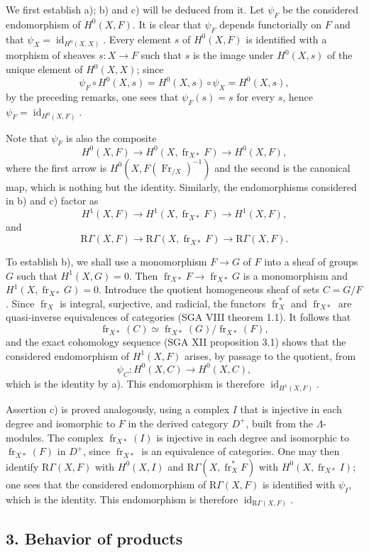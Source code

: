 \documentclass[11pt]{article}
\providecommand{\RGamma}{\mathrm R\Gamma}
\providecommand{\id}{\operatorname{id}}
\providecommand{\id}{\operatorname{id}}
\providecommand{\id}{\operatorname{id}}
\providecommand{\RGamma}{\mathrm R\Gamma}
\providecommand{\id}{\operatorname{id}}
\providecommand{\id}{\operatorname{id}}
\providecommand{\fr}{\operatorname{fr}}
\providecommand{\Fr}{\operatorname{Fr}}
\providecommand{\Fr}{\operatorname{Fr}}
\providecommand{\fr}{\operatorname{fr}}
\providecommand{\id}{\operatorname{id}}
\providecommand{\RGamma}{\mathrm R\Gamma}
\begin{document}
We first establish a); b) and c) will be deduced from it. Let $\psi_F$ be the considered endomorphism of $H^0(X,F)$. It is clear that $\psi_F$ depends functorially on $F$ and that $\psi_X=\id_{H^0(X,X)}$. Every element $s$ of $H^0(X,F)$ is identified with a morphism of sheaves $s:X\to F$ such that $s$ is the image under $H^0(X,s)$ of the unique element of $H^0(X,X)$; since
\[
\psi_F\circ H^0(X,s)=H^0(X,s)\circ\psi_X=H^0(X,s),
\]
by the preceding remarks, one sees that $\psi_F(s)=s$ for every $s$, hence $\psi_F=\id_{H^0(X,F)}$.

Note that $\psi_F$ is also the composite
\[
H^0(X,F)\longrightarrow H^0(X,\fr_{X*}F)
\longrightarrow H^0(X,F),
\]
where the first arrow is $H^0(X,F(\Fr_{/X})^{-1})$ and the second is the canonical map, which is nothing but the identity. Similarly, the endomorphisms considered in b) and c) factor as
\[
H^1(X,F)\longrightarrow H^1(X,\fr_{X*}F)
\longrightarrow H^1(X,F),
\]
and
\[
\RGamma(X,F)\longrightarrow \RGamma(X,\fr_{X*}F)
\longrightarrow \RGamma(X,F).
\]

To establish b), we shall use a monomorphism $F\to G$ of $F$ into a sheaf of groups $G$ such that $H^1(X,G)=0$. Then $\fr_{X*}F\to\fr_{X*}G$ is a monomorphism and $H^1(X,\fr_{X*}G)=0$. Introduce the quotient homogeneous sheaf of sets $C=G/F$. Since $\fr_X$ is integral, surjective, and radicial, the functors $\fr_X^*$ and $\fr_{X*}$ are quasi-inverse equivalences of categories (SGA VIII theorem 1.1). It follows that
\[
\fr_{X*}(C)\simeq\fr_{X*}(G)/\fr_{X*}(F),
\]
and the exact cohomology sequence (SGA XII proposition 3.1) shows that the considered endomorphism of $H^1(X,F)$ arises, by passage to the quotient, from
\[
\psi_C:H^0(X,C)\longrightarrow H^0(X,C),
\]
which is the identity by a). This endomorphism is therefore $\id_{H^1(X,F)}$.

Assertion c) is proved analogously, using a complex $I$ that is injective in each degree and isomorphic to $F$ in the derived category $D^+$, built from the $\Lambda$-modules. The complex $\fr_{X*}(I)$ is injective in each degree and isomorphic to $\fr_{X*}(F)$ in $D^+$, since $\fr_{X*}$ is an equivalence of categories. One may then identify $\RGamma(X,F)$ with $H^0(X,I)$ and $\RGamma(X,\fr_X^*F)$ with $H^0(X,\fr_{X*}I)$; one sees that the considered endomorphism of $\RGamma(X,F)$ is identified with $\psi_I$, which is the identity. This endomorphism is therefore $\id_{\RGamma(X,F)}$.

\subsection*{3. Behavior of products}
\end{document}
